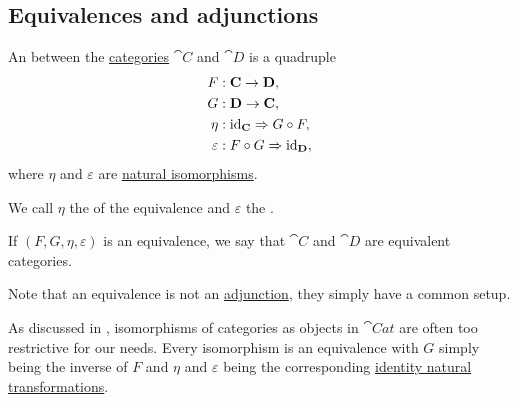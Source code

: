 \subsection{Equivalences and adjunctions}\label{subsec:equivalences_and_adjunctions}

\begin{definition}\label{def:category_equivalence}
  An  between the \hyperref[def:category]{categories} \( \cat{C} \) and \( \cat{D} \) is a quadruple
  \begin{equation}\label{eq:def:category_equivalence/signature}
    \begin{aligned}
                F &: \cat{C} \to \cat{D}, \\
                G &: \cat{D} \to \cat{C}, \\
             \eta &: \id_{\cat{C}} \Rightarrow G \bincirc F, \\
      \varepsilon &: F \bincirc G \Rightarrow \id_{\cat{D}},
    \end{aligned}
  \end{equation}
  where \( \eta \) and \( \varepsilon \) are \hyperref[thm:natural_isomorphism]{natural isomorphisms}.

  We call \( \eta \) the  of the equivalence and \( \varepsilon \) the .

  If \( (F, G, \eta, \varepsilon) \) is an equivalence, we say that \( \cat{C} \) and \( \cat{D} \) are equivalent categories.

  Note that an equivalence is not an \hyperref[def:category_adjunction]{adjunction}, they simply have a common setup.
\end{definition}

\begin{remark}\label{rem:category_equivalence}
  As discussed in , isomorphisms of categories as objects in \( \cat{Cat} \) are often too restrictive for our needs. Every isomorphism is an equivalence with \( G \) simply being the inverse of \( F \) and \( \eta \) and \( \varepsilon \) being the corresponding \hyperref[eq:def:functor_category/identity]{identity natural transformations}.
\end{remark}

